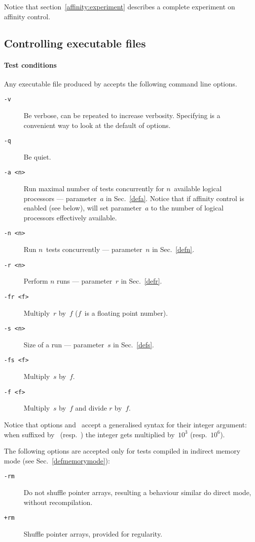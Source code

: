 Notice that section~\ref{affinity:experiment} describes a complete experiment
on affinity control.

\subsection{Controlling\label{exec:control} executable files}

\paragraph{Test conditions}
Any executable file produced by \litmus{} accepts the following
command line options.
\begin{description}
\item[{\tt -v}] Be verbose, can be repeated to increase verbosity.
Specifying  is a convenient way to look at the default of options.
\item[{\tt -q}] Be quiet.
\item[{\tt -a <n>}] Run maximal number of tests concurrently for $n$~available
logical processors --- parameter~$a$ in Sec.~\ref{defa}.
Notice that if affinity control is enabled (see below),  will
set parameter~$a$ to the number of logical processors effectively available.
\item[{\tt -n <n>}] Run $n$~tests concurrently --- parameter~$n$
in Sec.~\ref{defn}.
\item[{\tt -r <n>}] Perform $n$ runs --- parameter~$r$ in Sec.~\ref{defr}.
\item[{\tt -fr <f>}] Multiply~$r$ by~$f$ ($f$~is a floating point number).
\item[{\tt -s <n>}] Size of a run --- parameter~$s$ in Sec.~\ref{defs}.
\item[{\tt -fs <f>}] Multiply~$s$ by~$f$.
\item[{\tt -f <f>}] Multiply~$s$ by~$f$ and divide $r$ by~$f$.
\end{description}
\label{generalized:integer}Notice that options  and~
accept a generalised
syntax for their integer argument: when suffixed by~ (resp.~)
the integer gets multiplied by~$10^3$ (resp.~$10^6$).

\label{rm}The following options are accepted only for tests compiled
in indirect memory mode (see Sec.~\ref{defmemorymode}):
\begin{description}
\item[{\tt -rm}] Do not shuffle pointer arrays, resulting a behaviour
similar do direct mode, without recompilation.
\item[{\tt +rm}] Shuffle pointer arrays, provided for regularity.
\end{description}

